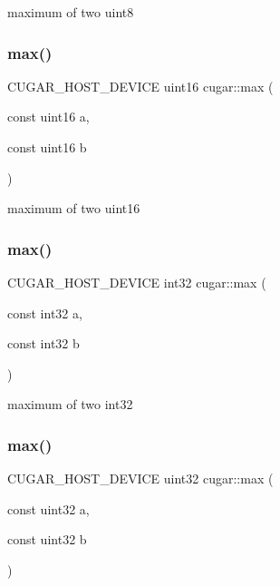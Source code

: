 maximum of two uint8 \mbox{\label{group___basic_gad7f98145cf912b8c66a7675cd9cb5e18}} 
\subsubsection{\texorpdfstring{max()}{max()}\hspace{0.1cm}{\footnotesize\ttfamily [4/8]}}
{\footnotesize\ttfamily C\+U\+G\+A\+R\+\_\+\+H\+O\+S\+T\+\_\+\+D\+E\+V\+I\+CE uint16 cugar\+::max (\begin{DoxyParamCaption}\item[{const uint16}]{a,  }\item[{const uint16}]{b }\end{DoxyParamCaption})\hspace{0.3cm}{\ttfamily [inline]}}

maximum of two uint16 \mbox{\label{group___basic_ga4973552119d9d62f4c9db07d08dbc3d6}} 
\subsubsection{\texorpdfstring{max()}{max()}\hspace{0.1cm}{\footnotesize\ttfamily [5/8]}}
{\footnotesize\ttfamily C\+U\+G\+A\+R\+\_\+\+H\+O\+S\+T\+\_\+\+D\+E\+V\+I\+CE int32 cugar\+::max (\begin{DoxyParamCaption}\item[{const int32}]{a,  }\item[{const int32}]{b }\end{DoxyParamCaption})\hspace{0.3cm}{\ttfamily [inline]}}

maximum of two int32 \mbox{\label{group___basic_gaabae3013fbdf1d86ce652f218a7f2bb2}} 
\subsubsection{\texorpdfstring{max()}{max()}\hspace{0.1cm}{\footnotesize\ttfamily [6/8]}}
{\footnotesize\ttfamily C\+U\+G\+A\+R\+\_\+\+H\+O\+S\+T\+\_\+\+D\+E\+V\+I\+CE uint32 cugar\+::max (\begin{DoxyParamCaption}\item[{const uint32}]{a,  }\item[{const uint32}]{b }\end{DoxyParamCaption})\hspace{0.3cm}{\ttfamily [inline]}}

